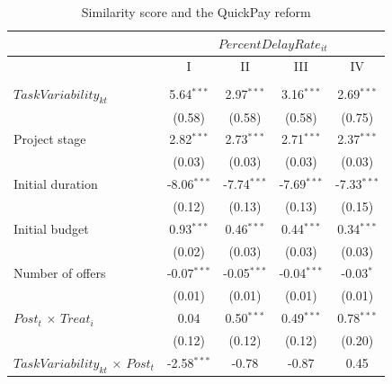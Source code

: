 \documentclass[
]{article}
\begin{document}
\begin{table}[htbp]
   \caption{Similarity score and the QuickPay reform}
   \centering
   \small
   \begin{tabular}{lcccc}
      \toprule
      \midrule  & \multicolumn{4}{c}{$PercentDelayRate_{it}$}\\
      \midrule  & I & II & III & IV\\
      \midrule \\
      $TaskVariability_{kt}$                                        & 5.64$^{***}$  & 2.97$^{***}$  & 3.16$^{***}$  & 2.69$^{***}$\\   
                                                                    & (0.58)        & (0.58)        & (0.58)        & (0.75)\\   
      Project stage                                                 & 2.82$^{***}$  & 2.73$^{***}$  & 2.71$^{***}$  & 2.37$^{***}$\\   
                                                                    & (0.03)        & (0.03)        & (0.03)        & (0.03)\\   
      Initial duration                                              & -8.06$^{***}$ & -7.74$^{***}$ & -7.69$^{***}$ & -7.33$^{***}$\\   
                                                                    & (0.12)        & (0.13)        & (0.13)        & (0.15)\\   
      Initial budget                                                & 0.93$^{***}$  & 0.46$^{***}$  & 0.44$^{***}$  & 0.34$^{***}$\\   
                                                                    & (0.02)        & (0.03)        & (0.03)        & (0.03)\\   
      Number of offers                                              & -0.07$^{***}$ & -0.05$^{***}$ & -0.04$^{***}$ & -0.03$^{*}$\\   
                                                                    & (0.01)        & (0.01)        & (0.01)        & (0.01)\\   
      $Post_t$ $\times$ $Treat_i$                                   & 0.04          & 0.50$^{***}$  & 0.49$^{***}$  & 0.78$^{***}$\\   
                                                                    & (0.12)        & (0.12)        & (0.12)        & (0.20)\\   
      $TaskVariability_{kt}$ $\times$ $Post_t$                      & -2.58$^{***}$ & -0.78         & -0.87         & 0.45\\   

\end{tabular}
\end{table}
\end{document}
